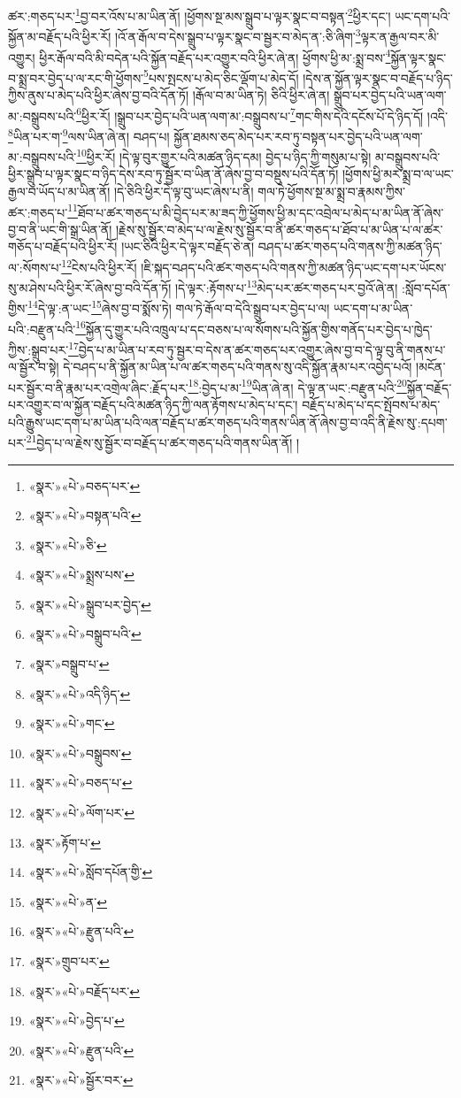 ཚར་:གཅད་པར་\footnote{«སྣར་»«པེ་»བཅད་པར་}བྱ་བར་འོས་པ་མ་ཡིན་ནོ། །ཕྱོགས་སྔ་མས་སྒྲུབ་པ་ལྟར་སྣང་བ་བསྟན་\footnote{«སྣར་»«པེ་»བསྟན་པའི་}ཕྱིར་དང་། ཡང་དག་པའི་སྐྱོན་མ་བརྗོད་པའི་ཕྱིར་རོ། །འོ་ན་རྒོལ་བ་དེས་སྒྲུབ་པ་ལྟར་སྣང་བ་སྦྱར་བ་མེད་ན་:ཅི་ཞིག་\footnote{«སྣར་»«པེ་»ཅི་}ལྟར་ན་རྒྱལ་བར་མི་འགྱུར། ཕྱིར་རྒོལ་བའི་མི་བདེན་པའི་སྐྱོན་བརྗོད་པར་འགྱུར་བའི་ཕྱིར་ཞེ་ན། ཕྱོགས་ཕྱི་མ་:སྨྲ་བས་\footnote{«སྣར་»«པེ་»སྨྲས་པས་}སྐྱོན་ལྟར་སྣང་བ་སྨྲ་བར་བྱེད་པ་ལ་རང་གི་ཕྱོགས་\footnote{«སྣར་»«པེ་»སྒྲུབ་པར་བྱེད་}པས་སྤངས་པ་མེད་ཅིང་ལྡོག་པ་མེད་དོ། །དེས་ན་སྐྱོན་ལྟར་སྣང་བ་བརྗོད་པ་ཉིད་ཀྱིས་ནུས་པ་མེད་པའི་ཕྱིར་ཞེས་བྱ་བའི་དོན་ཏོ། །རྒོལ་བ་མ་ཡིན་ཏེ། ཅིའི་ཕྱིར་ཞེ་ན། སྒྲུབ་པར་བྱེད་པའི་ཡན་ལག་མ་:བསྒྲུབས་པའི་\footnote{«སྣར་»«པེ་»བསྒྲུབ་པའི་}ཕྱིར་རོ། །སྒྲུབ་པར་བྱེད་པའི་ཡན་ལག་མ་:བསྒྲུབས་པ་\footnote{«སྣར་»བསྒྲུབ་པ་}གང་གིས་དེའི་དངོས་པོ་དེ་ཉིད་དོ། །འདི་\footnote{«སྣར་»«པེ་»འདི་ཉིད་}ཡིན་པར་ག་\footnote{«སྣར་»«པེ་»གང་}ལས་ཡིན་ཞེ་ན། བཤད་པ། སྐྱོན་ཐམས་ཅད་མེད་པར་རབ་ཏུ་བསྟན་པར་བྱེད་པའི་ཡན་ལག་མ་:བསྒྲུབས་པའི་\footnote{«སྣར་»«པེ་»བསྒྲུབས་}ཕྱིར་རོ། །དེ་ལྟ་བུར་གྱུར་པའི་མཚན་ཉིད་དམ། བྱེད་པ་ཉིད་ཀྱི་གསུམ་པ་སྟེ། མ་བསྒྲུབས་པའི་ཕྱིར་སྒྲུབ་པ་ལྟར་སྣང་བ་ཉིད་དེས་རབ་ཏུ་སྦྱོར་བ་ཡིན་ནོ་ཞེས་བྱ་བ་བསྡུས་པའི་དོན་ཏོ། །ཕྱོགས་ཕྱི་མར་སྨྲ་བ་ལ་ཡང་རྒྱལ་བ་ཡོད་པ་མ་ཡིན་ནོ། །དེ་ཅིའི་ཕྱིར་དེ་ལྟ་བུ་ཡང་ཞེས་པ་ནི། གལ་ཏེ་ཕྱོགས་སྔ་མ་སྨྲ་བ་རྣམས་ཀྱིས་ཚར་:གཅད་པ་\footnote{«སྣར་»«པེ་»བཅད་པ་}ཐོབ་པ་ཚར་གཅད་པ་མི་བྱེད་པར་མ་ཟད་ཀྱི་ཕྱོགས་ཕྱི་མ་དང་འབྲེལ་པ་མེད་པ་མ་ཡིན་ནོ་ཞེས་བྱ་བ་ནི་ཡང་གི་སྒྲ་ཡིན་ནོ། །རྗེས་སུ་སྦྱོར་བ་མེད་པ་ལ་རྗེས་སུ་སྦྱོར་བ་ནི་ཚར་གཅད་པ་ཐོབ་པ་མ་ཡིན་པ་ལ་ཚར་གཅོད་པ་བརྗོད་པའི་ཕྱིར་རོ། །ཡང་ཅིའི་ཕྱིར་དེ་ལྟར་བརྗོད་ཅེ་ན། བཤད་པ་ཚར་གཅད་པའི་གནས་ཀྱི་མཚན་ཉིད་ལ་:སོགས་པ་\footnote{«སྣར་»«པེ་»ལོག་པར་}ངེས་པའི་ཕྱིར་རོ། །ཇི་སྐད་བཤད་པའི་ཚར་གཅད་པའི་གནས་ཀྱི་མཚན་ཉིད་ཡང་དག་པར་ཡོངས་སུ་མ་ཤེས་པའི་ཕྱིར་རོ་ཞེས་བྱ་བའི་དོན་ཏོ། །དེ་ལྟར་:རྟོགས་པ་\footnote{«སྣར་»རྟོག་པ་}མེད་པར་ཚར་གཅད་པར་བྱའོ་ཞེ་ན། :སློབ་དཔོན་གྱིས་\footnote{«སྣར་»«པེ་»སློབ་དཔོན་གྱི་}དེ་ལྟ་:ན་ཡང་\footnote{«སྣར་»«པེ་»ན་}ཞེས་བྱ་བ་སྨོས་ཏེ། གལ་ཏེ་རྒོལ་བ་དེའི་སྒྲུབ་པར་བྱེད་པ་ལ། ཡང་དག་པ་མ་ཡིན་པའི་:བརྫུན་པའི་\footnote{«སྣར་»«པེ་»རྫུན་པའི་}སྐྱོན་དུ་གྱུར་པའི་འཁྲུལ་པ་དང་བཅས་པ་ལ་སོགས་པའི་སྐྱོན་གྱིས་གནོད་པར་བྱེད་པ་ཁྱེད་ཀྱིས་:སྒྲུབ་པར་\footnote{«སྣར་»གྲུབ་པར་}བྱེད་པ་མ་ཡིན་པ་རབ་ཏུ་སྦྱར་བ་དེས་ན་ཚར་གཅད་པར་འགྱུར་ཞེས་བྱ་བ་དེ་ལྟ་བུ་ནི་གནས་པ་ལ་སྦྱོར་བ་སྟེ། དེ་བཤད་པ་ནི་སྐྱོན་མ་ཡིན་པ་ལ་ཚར་གཅད་པའི་གནས་སུ་འདི་སྐྱོན་རྣམ་པར་འབྱེད་པའོ། །མངོན་པར་སྦྱོར་བ་ནི་རྣམ་པར་འགྲེལ་ཞིང་:རྗོད་པར་\footnote{«སྣར་»«པེ་»བརྗོད་པར་}:བྱེད་པ་མ་\footnote{«སྣར་»«པེ་»བྱེད་པ་}ཡིན་ཞེ་ན། དེ་ལྟ་ན་ཡང་:བརྫུན་པའི་\footnote{«སྣར་»«པེ་»རྫུན་པའི་}སྐྱོན་བརྗོད་པར་འགྱུར་བ་ལ་སྐྱོན་བརྗོད་པའི་མཚན་ཉིད་ཀྱི་ལན་རྟོགས་པ་མེད་པ་དང་། བརྗོད་པ་མེད་པ་དང་སྤོབས་པ་མེད་པའི་རྒྱུས་ཡང་དག་པ་མ་ཡིན་པའི་ལན་བརྗོད་པ་ཚར་གཅད་པའི་གནས་ཡིན་ནོ་ཞེས་བྱ་བ་འདི་ནི་རྗེས་སུ་:དཔག་པར་\footnote{«སྣར་»«པེ་»སྦྱོར་བར་}བྱེད་པ་ལ་རྗེས་སུ་སྦྱོར་བ་བརྗོད་པ་ཚར་གཅད་པའི་གནས་ཡིན་ནོ། །
